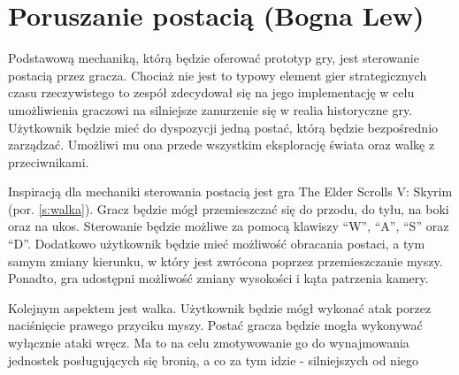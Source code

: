 \section{Poruszanie postacią (Bogna Lew)}
Podstawową mechaniką, którą będzie oferować prototyp gry, jest sterowanie postacią przez gracza. Chociaż nie jest
to typowy element gier strategicznych czasu rzeczywistego to zespół zdecydował się na jego implementację w celu umożliwienia
graczowi na silniejsze zanurzenie się w realia historyczne gry. Użytkownik będzie
mieć do dyspozycji jedną postać, którą będzie bezpośrednio zarządzać. Umożliwi mu ona przede wszystkim eksplorację
świata oraz walkę z przeciwnikami.

Inspiracją dla mechaniki sterowania postacią jest gra The Elder Scrolls V: Skyrim (por. \ref{s:walka}). Gracz będzie mógł przemieszczać się
do przodu, do tyłu, na boki oraz na ukos. Sterowanie będzie możliwe za pomocą klawiszy  “W”, “A”, “S” oraz “D”.
Dodatkowo użytkownik będzie mieć możliwość obracania postaci, a tym samym zmiany kierunku, w który jest zwrócona poprzez
przemieszczanie myszy. Ponadto, gra udostępni możliwość zmiany wysokości i kąta patrzenia kamery.

Kolejnym aspektem jest walka. Użytkownik będzie mógł wykonać atak porzez naciśnięcie prawego przyciku myszy. Postać
gracza będzie mogła wykonywać wyłącznie ataki wręcz. Ma to na celu zmotywowanie go do wynajmowania jednostek posługujących
się bronią, a co za tym idzie - silniejszych od niego